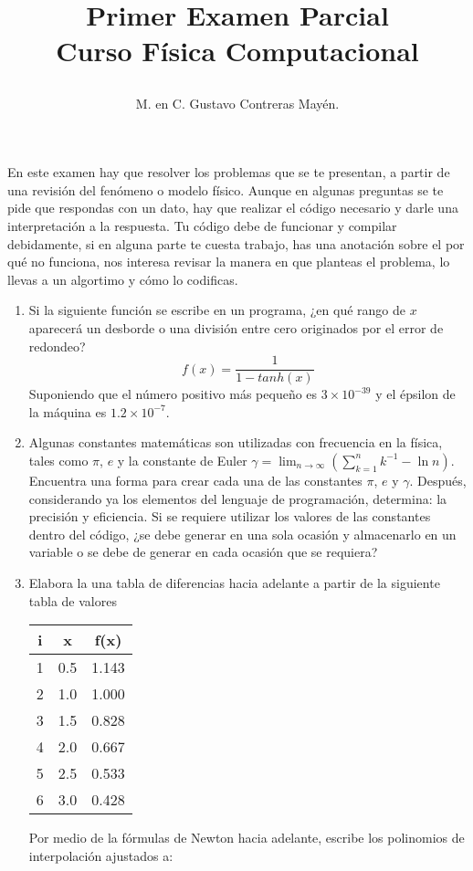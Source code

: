 \documentclass[12pt]{article}
\author{M. en C. Gustavo Contreras Mayén.}
\title{\begin{large} Primer Examen Parcial \\ Curso Física Computacional\end{large}}
\date{ }
\begin{document}
\maketitle
En este examen hay que resolver los problemas que se te presentan, a partir de una revisión del fenómeno o modelo físico. Aunque en algunas preguntas se te pide que respondas con un dato, hay que realizar el código necesario y darle una interpretación a la respuesta. Tu código debe de funcionar y compilar debidamente, si en alguna parte te cuesta trabajo, has una anotación sobre el por qué no funciona, nos interesa revisar la manera en que planteas el problema, lo llevas a un algortimo y cómo lo codificas.
\begin{enumerate}
\item Si la siguiente función se escribe en un programa, ¿en qué rango de $x$ aparecerá un desborde o una división entre cero originados por el error de redondeo?
\[ f(x)=\dfrac{1}{1-tanh(x)} \]
Suponiendo que el número positivo más pequeño es $3 \times 10^{-39}$  y el épsilon de la máquina es $1.2 \times 10^{-7}$.
\item Algunas constantes matemáticas son utilizadas con frecuencia en la física, tales como $\pi$, $e$ y la constante de Euler $\gamma = \lim_{n\rightarrow \infty} (\sum_{k=1}^{n} k^{-1} - \ln n)$. Encuentra una forma para crear cada una de las constantes $\pi$, $e$ y $\gamma$. Después, considerando ya los elementos del lenguaje de programación, determina: la precisión y eficiencia. Si se requiere utilizar los valores de las constantes dentro del código, ¿se debe generar en una sola ocasión y almacenarlo en un variable o se debe de generar en cada ocasión que se requiera?
\item Elabora la una tabla de diferencias hacia adelante a partir de la siguiente tabla de valores
\begin{center}
\begin{tabular}{c | c | c}
i & x & f(x) \\
\hline 1 & 0.5 & 1.143 \\
\hline 2 & 1.0 & 1.000 \\
\hline 3 & 1.5 & 0.828 \\
\hline 4 & 2.0 & 0.667 \\
\hline 5 & 2.5 & 0.533 \\
\hline 6 & 3.0 & 0.428 
\end{tabular}
\end{center}
Por medio de la fórmulas de Newton hacia adelante, escribe los polinomios de interpolación ajustados a:
\begin{enumerate}

\end{enumerate}
\end{enumerate}
\end{document}
